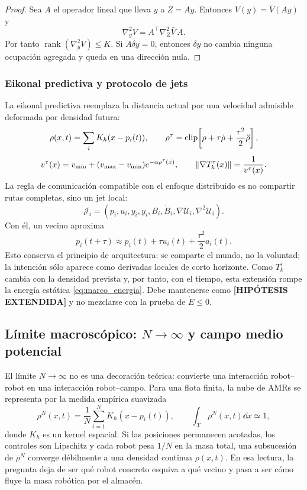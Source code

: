 \begin{proof}
Sea $A$ el operador lineal que lleva $y$ a $Z=Ay$. Entonces
$V(y)=\bar V(Ay)$ y
\[
  \nabla_y^2V=A^\top\nabla_Z^2\bar V\,A.
\]
Por tanto $\operatorname{rank}(\nabla_y^2V)\le K$. Si $A\delta y=0$, entonces
$\delta y$ no cambia ninguna ocupación agregada y queda en una dirección nula.
\end{proof}

\subsubsection{Eikonal predictiva y protocolo de jets}

La eikonal predictiva reemplaza la distancia actual por una velocidad admisible
deformada por densidad futura:
\[
  \rho(x,t)=\sum_i K_h(x-p_i(t)),
  \qquad
  \rho^\tau=\operatorname{clip}\!\left[\rho+\tau\dot\rho+\frac{\tau^2}{2}\ddot\rho\right],
\]
\[
  v^\tau(x)=v_{\min}+(v_{\max}-v_{\min})e^{-\alpha\rho^\tau(x)},
  \qquad
  \left\|\nabla T_k^\tau(x)\right\|=\frac{1}{v^\tau(x)}.
\]
La regla de comunicación compatible con el enfoque distribuido es no compartir rutas
completas, sino un jet local:
\[
  \mathcal{J}_i=(p_i,u_i,y_i,\dot y_i,B_i,\dot B_i,\nabla\mathcal{U}_i,
  \nabla^2\mathcal{U}_i).
\]
Con él, un vecino aproxima
\[
  p_i(t+\tau)\approx p_i(t)+\tau u_i(t)+\frac{\tau^2}{2}a_i(t).
\]
Esto conserva el principio de arquitectura: se comparte el mundo, no la voluntad; la
intención sólo aparece como derivadas locales de corto horizonte.
Como $T_k^\tau$ cambia con la densidad prevista y, por tanto, con el tiempo, esta
extensión rompe la energía estática \eqref{eq:marco_energia}. Debe mantenerse como
\textbf{[HIPÓTESIS EXTENDIDA]} y no mezclarse con la prueba de $\dot E\le0$.

\subsection{Límite macroscópico: \texorpdfstring{$N\to\infty$}{N a infinito} y campo medio potencial}
\label{subsec:limite-campo-medio}

El límite $N\to\infty$ no es una decoración teórica: convierte una interacción
robot--robot en una interacción robot--campo. Para una flota finita, la nube de AMRs se
representa por la medida empírica suavizada
\begin{equation}
  \rho^N(x,t)=\frac{1}{N}\sum_{i=1}^{N}K_h\!\left(x-p_i(t)\right),
  \qquad
  \int_{\mathcal X}\rho^N(x,t)\dd x\simeq 1,
  \label{eq:medida_empirica_mfg}
\end{equation}
donde $K_h$ es un kernel espacial. Si las posiciones permanecen acotadas, los controles
son Lipschitz y cada robot pesa $1/N$ en la masa total, una subsucesión de
$\rho^N$ converge débilmente a una densidad continua $\rho(x,t)$. En esa lectura, la
pregunta deja de ser qué robot concreto esquiva a qué vecino y pasa a ser cómo fluye la
masa robótica por el almacén.

